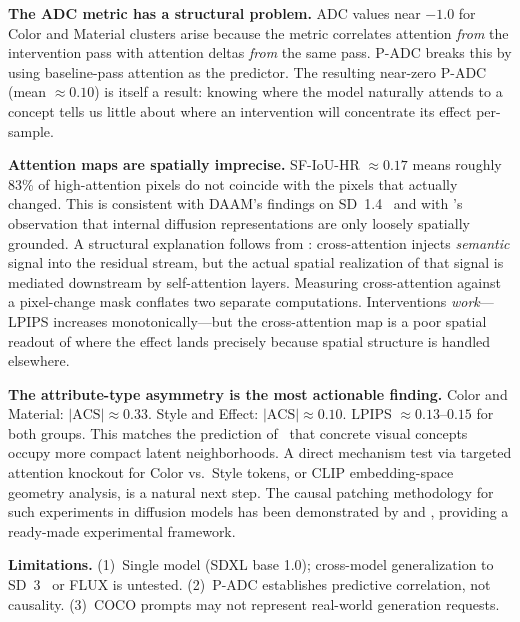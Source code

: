 \documentclass{article}
\begin{document}
\textbf{The ADC metric has a structural problem.}
ADC values near $-1.0$ for Color and Material clusters arise because
the metric correlates attention \emph{from} the intervention pass
with attention deltas \emph{from} the same pass.  P-ADC breaks this
by using baseline-pass attention as the predictor.  The resulting
near-zero P-ADC (mean $\approx 0.10$) is itself a result: knowing
where the model naturally attends to a concept tells us little about
where an intervention will concentrate its effect per-sample.

\textbf{Attention maps are spatially imprecise.}
SF-IoU-HR $\approx 0.17$ means roughly 83\% of high-attention pixels
do not coincide with the pixels that actually changed.  This is
consistent with DAAM's findings on SD~1.4~\citep{tang2023daam} and
with \citet{chefer2024hidden}'s observation that internal diffusion
representations are only loosely spatially grounded.  A structural
explanation follows from \citet{ma2024crossself}: cross-attention
injects \emph{semantic} signal into the residual stream, but the
actual spatial realization of that signal is mediated downstream
by self-attention layers.  Measuring cross-attention against a
pixel-change mask conflates two separate computations.  Interventions
\emph{work}---LPIPS increases monotonically---but the cross-attention
map is a poor spatial readout of where the effect lands precisely
because spatial structure is handled elsewhere.

\textbf{The attribute-type asymmetry is the most actionable finding.}
Color and Material: $|\text{ACS}| \approx 0.33$.  Style and Effect:
$|\text{ACS}| \approx 0.10$.  LPIPS $\approx 0.13$--$0.15$ for both
groups.  This matches the prediction of~\citet{kwon2023diffusion}
that concrete visual concepts occupy more compact latent
neighborhoods.  A direct mechanism test via targeted attention
knockout for Color vs.\ Style tokens, or CLIP embedding-space
geometry analysis, is a natural next step.  The causal patching
methodology for such experiments in diffusion models has been
demonstrated by \citet{li2026circuit} and \citet{chen2026circuits3d},
providing a ready-made experimental framework.

\textbf{Limitations.}
(1)~Single model (SDXL base 1.0); cross-model generalization to
SD~3~\citep{esser2024scaling} or FLUX is untested.
(2)~P-ADC establishes predictive correlation, not causality.
(3)~COCO prompts may not represent real-world generation requests.

\end{document}
